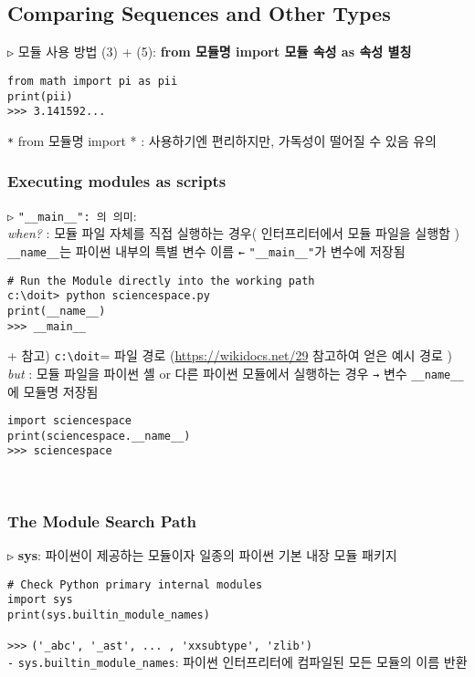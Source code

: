 \documentclass[11pt,a4paper]{article}
\begin{document}
\subsection{\Large\textbf{Comparing Sequences and Other Types}}
\begin{spacing}{1.5}
\texttt{▷} 모듈 사용 방법 (3) + (5): \textbf{from 모듈명 import 모듈 속성 as 속성 별칭}
\begin{lstlisting}[label={list:first}]
from math import pi as pii
print(pii)
>>> 3.141592...
\end{lstlisting}
\hspace*{2em}\texttt{*} from 모듈명 import * : 사용하기엔 편리하지만, 가독성이 떨어질 수 있음 유의\\

\subsubsection{\Large\textbf{Executing modules as scripts}}
\texttt{▷} \verb|"__main__": 의 의미|:\\

\textit{when?} : 모듈 파일 자체를 직접 실행하는 경우( 인터프리터에서 모듈 파일을 실행함 )\\
\texttt{\_\_name\_\_}는 파이썬 내부의 특별 변수 이름 \texttt{←} \texttt{"\_\_main\_\_"}가 변수에 저장됨
\begin{lstlisting}[label={list:first}]
# Run the Module directly into the working path
c:\doit> python sciencespace.py
print(__name__)
>>> __main__
\end{lstlisting}
+ 참고) \verb|c:\doit|= 파일 경로 (\url{https://wikidocs.net/29} 참고하여 얻은 예시 경로 )\\

\textit{but} : 모듈 파일을 파이썬 셸 or 다른 파이썬 모듈에서 실행하는 경우 \texttt{→}  변수 \texttt{\_\_name\_\_}  에 모듈명 저장됨
\begin{lstlisting}[label={list:first}]
import sciencespace
print(sciencespace.__name__)
>>> sciencespace
\end{lstlisting}
\end{spacing}\\

\subsubsection{\Large\textbf{The Module Search Path}}
\texttt{▷} \textbf{sys}: 파이썬이 제공하는 모듈이자 일종의 파이썬 기본 내장 모듈 패키지
\begin{lstlisting}[label={list:first}]
# Check Python primary internal modules
import sys
print(sys.builtin_module_names)
\end{lstlisting}
\verb|>>>| \verb|('_abc', '_ast', ... , 'xxsubtype', 'zlib')|\\
\texttt{-} \verb|sys.builtin_module_names|: 파이썬 인터프리터에 컴파일된 모든 모듈의 이름 반환\\
\end{document}
